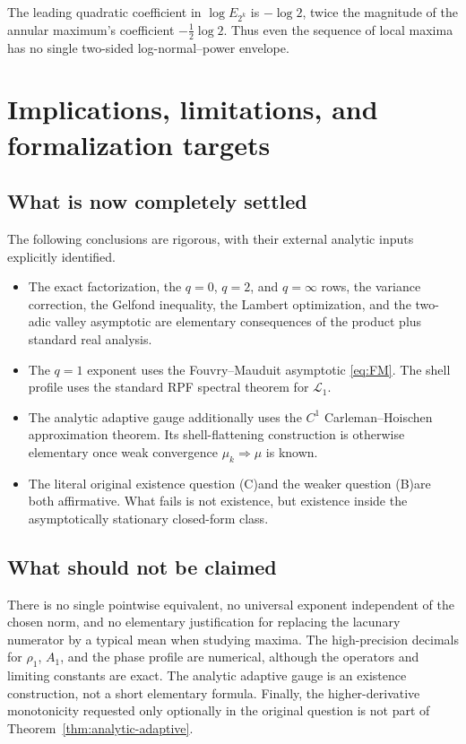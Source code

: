 \documentclass[11pt]{article}
\theoremstyle{definition}
\theoremstyle{remark}
\newcommand{\Lop}{\mathcal L}
\newcommand{\Ceq}{\textup{(C)}}
\newcommand{\Beq}{\textup{(B)}}
\begin{document}
The leading quadratic coefficient in \(\log E_{2^k}\) is \(-\log2\),
twice the magnitude of the annular maximum's coefficient
\(-\tfrac12\log2\).  Thus even the sequence of local maxima has no single
two-sided log-normal--power envelope.

\section{Implications, limitations, and formalization targets}

\subsection{What is now completely settled}

The following conclusions are rigorous, with their external analytic inputs
explicitly identified.
\begin{itemize}
\item The exact factorization, the \(q=0\), \(q=2\), and \(q=\infty\) rows,
the variance correction, the Gelfond inequality, the Lambert optimization,
and the two-adic valley asymptotic are elementary consequences of the product
plus standard real analysis.
\item The \(q=1\) exponent uses the Fouvry--Mauduit asymptotic
\eqref{eq:FM}.  The shell profile uses the standard RPF spectral theorem for
\(\Lop_1\).
\item The analytic adaptive gauge additionally uses the \(C^1\)
Carleman--Hoischen approximation theorem.  Its shell-flattening construction
is otherwise elementary once weak convergence \(\mu_k\Rightarrow\mu\) is
known.
\item The literal original existence question \Ceq and the weaker
question \Beq are both affirmative.  What fails is not existence, but
existence inside the asymptotically stationary closed-form class.
\end{itemize}

\subsection{What should not be claimed}

There is no single pointwise equivalent, no universal exponent independent of
the chosen norm, and no elementary justification for replacing the lacunary
numerator by a typical mean when studying maxima.  The high-precision decimals
for \(\rho_1\), \(A_1\), and the phase profile are numerical, although the
operators and limiting constants are exact.  The analytic adaptive gauge is an
existence construction, not a short elementary formula.  Finally, the
higher-derivative monotonicity requested only optionally in the original
question is not part of Theorem~\ref{thm:analytic-adaptive}.
\end{document}
